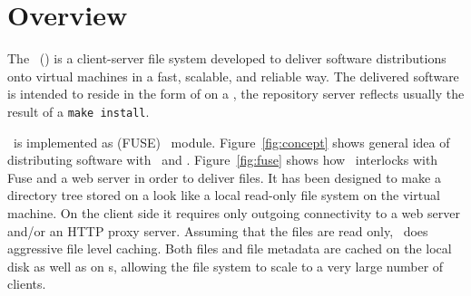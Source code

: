 \chapter{Overview}

The \cernvmfs\ (\cvmfs) is a client-server file system developed to deliver software distributions onto virtual machines in a fast, scalable, and reliable way.
The delivered software is intended to reside in the form of  on a , \ie the repository server reflects usually the result of a \texttt{make install}.

\cvmfs\ is implemented as  (FUSE)~\cite{fuse} module. 
Figure~\ref{fig:concept} shows general idea of distributing software with \cernvm\ and \cvmfs.
Figure~\ref{fig:fuse} shows how \cvmfs\ interlocks with Fuse and a web server in order to deliver files.
It has been designed to make a directory tree stored on a  look like a local read-only file system on the virtual machine. 
On the client side it requires only outgoing  connectivity to a web server and/or an HTTP proxy server. 
Assuming that the files are read only, \cvmfs\ does aggressive file level caching. 
Both files and file metadata are cached on the local disk as well as on s, allowing the file system to scale to a very large number of clients.

